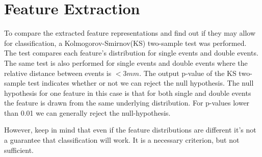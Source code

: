 \documentclass[12pt, notitlepage]{article}
\begin{document}
\section{Feature Extraction}
To compare the extracted feature representations and find out if they may allow for classification,
a Kolmogorov-Smirnov(KS) two-sample test was performed. The test compares each feature's distribution
for single events and double events. The same test is also performed for single events and double events 
where the relative distance between events is $< 3mm$. The output p-value of the KS two-sample test
indicates whether or not we can reject the null hypothesis. The null hypothesis for one feature in this 
case is that for both single and double events the feature is drawn from the same underlying distribution.
For p-values lower than 0.01 we can generally reject the null-hypothesis. 

However, keep in mind that even if the feature distributions are different it's not a guarantee that 
classification will work. It is a necessary criterion, but not sufficient.
\end{document}
